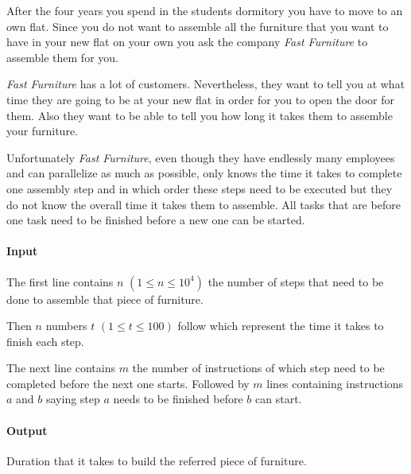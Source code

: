 



\makeheader

After the four years you spend in the students dormitory you have to move to an own flat. Since you do not want to
assemble all the furniture that you want to have in your new flat on your own you ask the company \textit{Fast Furniture}
to assemble them for you.

\textit{Fast Furniture} has a lot of customers. Nevertheless, they want to tell you at what time they are going to be at
your new flat in order for you to open the door for them.  Also they want to be able to tell you how long it takes them
to assemble your furniture.

Unfortunately \textit{Fast Furniture}, even though they have endlessly many employees and can parallelize
as much as possible, only knows the time it takes to complete one assembly step and in which
order these steps need to be executed but they do not know the overall time it takes them to assemble.
All tasks that are before one task need to be finished before a new one can be started.


\paragraph*{Input}

The first line contains $n$ $(1\leq n \leq 10^4)$ the number of steps that need to be done to assemble that piece of furniture.

Then $n$ numbers $t$ $(1\leq t \leq 100)$ follow which represent the time it takes to finish each step.

The next line contains $m$ the number of instructions of which step need to be completed before the next one starts. Followed
by $m$ lines containing instructions $a$ and $b$ saying step $a$ needs to be finished before $b$ can start.

\paragraph*{Output}

Duration that it takes to build the referred piece of furniture.

\begin{samples}
\end{samples}


